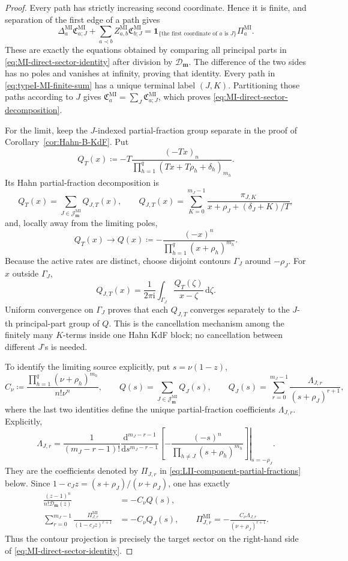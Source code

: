 \documentclass[10pt]{amsart}
\newcommand{\dd}{\,\mathrm d}
\newcommand{\mm}{\boldsymbol m}
\theoremstyle{plain}
\theoremstyle{definition}
\theoremstyle{remark}
\begin{document}
\begin{proof}
Every path has strictly increasing second coordinate. Hence it is finite,
and separation of the first edge of a path gives
\[
 \Delta_a^{\mathrm{MI}}\mathfrak C_{a;J}^{\mathrm{MI}}
 +\sum_{a\prec b}Z_{a,b}^{\mathrm{MI}}
  \mathfrak C_{b;J}^{\mathrm{MI}}
 =\mathbf1_{\{\text{the first coordinate of }a\text{ is }J\}}
  \Pi_a^{\mathrm{MI}}.
\]
These are exactly the equations obtained by comparing all principal
parts in \eqref{eq:MI-direct-sector-identity} after division by
\(\mathcal D_{\boldsymbol m}\). The difference of the two sides has no
poles and vanishes at infinity, proving that identity. Every path in
\eqref{eq:typeI-MI-finite-sum} has a unique terminal label \((J,K)\).
Partitioning those paths according to \(J\) gives
\(\mathfrak C_a^{\mathrm{MI}}
=\sum_J\mathfrak C_{a;J}^{\mathrm{MI}}\), which proves
\eqref{eq:MI-direct-sector-decomposition}.

For the limit, keep the \(J\)-indexed partial-fraction group separate in
the proof of Corollary~\ref{cor:Hahn-B-KdF}. Put
\[
 Q_T(x)\coloneq
 -T\frac{(-Tx)_n}
 {\prod_{h=1}^q(Tx+T\rho_h+\delta_h)_{m_h}}.
\]
Its Hahn partial-fraction decomposition is
\[
 Q_T(x)=\sum_{J\in\mathcal J_{\mm}^{\mathrm{MI}}}Q_{J,T}(x),
 \qquad
 Q_{J,T}(x)=\sum_{K=0}^{m_J-1}
 \frac{\pi_{J,K}}
 {x+\rho_J+(\delta_J+K)/T},
\]
and, locally away from the limiting poles,
\[
 Q_T(x)\longrightarrow
 Q(x)\coloneq-\frac{(-x)^n}
 {\prod_{h=1}^q(x+\rho_h)^{m_h}}.
\]
Because the active rates are distinct, choose disjoint contours
\(\Gamma_J\) around \(-\rho_J\). For \(x\) outside \(\Gamma_J\),
\[
 Q_{J,T}(x)=\frac1{2\pi\mathrm i}
 \int_{\Gamma_J}\frac{Q_T(\zeta)}{x-\zeta}\dd\zeta .
\]
Uniform convergence on \(\Gamma_J\) proves that each \(Q_{J,T}\)
converges separately to the \(J\)-th principal-part group of \(Q\).
This is the cancellation mechanism among the finitely many \(K\)-terms
inside one Hahn KdF block; no cancellation between different \(J\)'s is
needed.

To identify the limiting source explicitly, put \(s=\nu(1-z)\),
\[
 C_\nu\coloneq
 \frac{\prod_{h=1}^q(\nu+\rho_h)^{m_h}}{n!\nu^n},
 \qquad
 Q(s)=\sum_{J\in\mathcal J_{\mm}^{\mathrm{MI}}}Q_J(s),
 \qquad
 Q_J(s)=\sum_{r=0}^{m_J-1}
 \frac{\Lambda_{J,r}}{(s+\rho_J)^{r+1}},
\]
where the last two identities define the unique partial-fraction
coefficients \(\Lambda_{J,r}\). Explicitly,
\[
 \Lambda_{J,r}=\frac1{(m_J-r-1)!}
 \left.\frac{\mathrm d^{m_J-r-1}}{\mathrm ds^{m_J-r-1}}
 \left[-\frac{(-s)^n}
 {\displaystyle\prod_{h\ne J}(s+\rho_h)^{m_h}}\right]
 \right|_{s=-\rho_J}.
\]
They are the coefficients denoted by \(\Pi_{J,r}\) in
\eqref{eq:LII-component-partial-fractions} below.
Since
\(1-c_Jz=(s+\rho_J)/(\nu+\rho_J)\), one has exactly
\begin{align*}
 \frac{(z-1)^n}{n!\mathcal D_{\boldsymbol m}(z)}
 &=-C_\nu Q(s),\\
 \sum_{r=0}^{m_J-1}
 \frac{\Pi_{J,r}^{\mathrm{MI}}}{(1-c_Jz)^{r+1}}
 &=-C_\nu Q_J(s),
 \qquad
 \Pi_{J,r}^{\mathrm{MI}}
 =-\frac{C_\nu\Lambda_{J,r}}{(\nu+\rho_J)^{r+1}}.
\end{align*}
Thus the contour projection is precisely the target sector on the
right-hand side of \eqref{eq:MI-direct-sector-identity}.


\end{proof}
\end{document}
